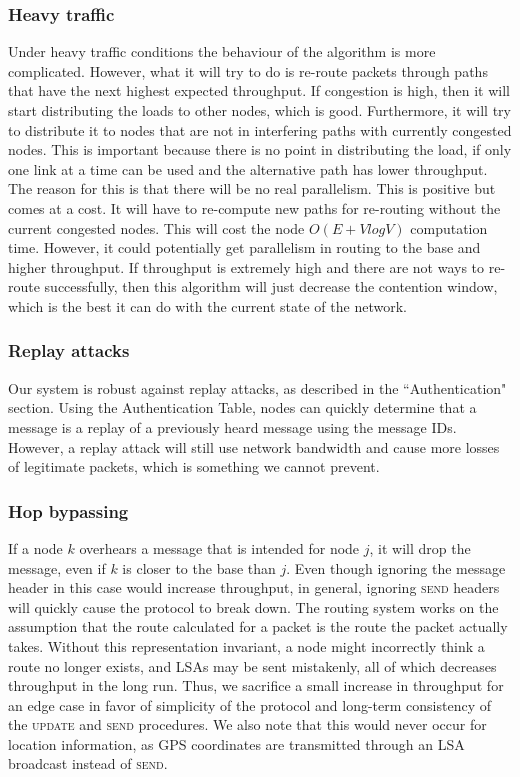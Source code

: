 \documentclass[letterpaper]{article}
\begin{document}
\subsubsection{Heavy traffic}

Under heavy traffic conditions the behaviour of the algorithm is more complicated. However, what it will try to do is re-route packets through paths that have the next highest expected throughput. If congestion is high, then it will start distributing the loads to other nodes, which is good. Furthermore, it will try to distribute it to nodes that are not in interfering paths with currently congested nodes. This is important because there is no point in distributing the load, if only one link at a time can be used and the alternative path has lower throughput. The reason for this is that there will be no real parallelism. This is positive but comes at a cost. It will have to re-compute new paths for re-routing without the current congested nodes. This will cost the node $O(E + VlogV)$ computation time. However, it could potentially get parallelism in routing to the base and higher throughput. If throughput is extremely high and there are not ways to re-route successfully, then this algorithm will just decrease the contention window, which is the best it can do with the current state of the network.

\subsubsection{Replay attacks}

Our system is robust against replay attacks, as described in the ``Authentication" section. Using the Authentication Table, 
nodes can quickly determine that a message is a replay of a previously heard message using the message IDs. However, 
a replay attack will still use network bandwidth and cause more losses of legitimate packets, which is something we cannot prevent.

\subsubsection{Hop bypassing}

If a node $k$ overhears a message that is intended for node $j$, it will drop the message, even if $k$ is closer to the base than $j$.
Even though ignoring the message header in this case would increase throughput, in general, ignoring \textsc{send} headers will quickly cause
the protocol to break down. The routing system works on the assumption that the route calculated for a packet is the route the packet
actually takes. Without this representation invariant, a node might incorrectly think a route no longer exists, and LSAs may be sent 
mistakenly, all of which decreases throughput in the long run. Thus, we sacrifice a small increase in throughput for an edge case in
favor of simplicity of the protocol and long-term consistency of the \textsc{update} and \textsc{send} procedures. We also note that 
this would never occur for location information, as GPS coordinates are transmitted through an LSA broadcast instead of \textsc{send}. 
\end{document}
